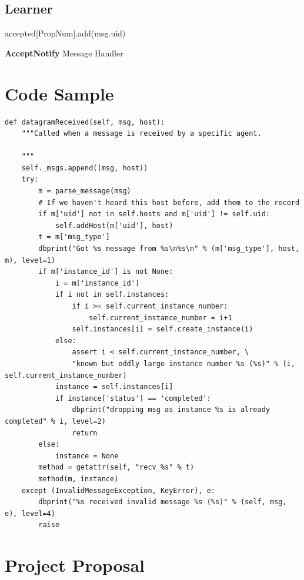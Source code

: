 \documentclass[12pt,twoside,notitlepage]{report}
\newcommand{\msg}[1] {{\bf #1}}         %
\begin{document}
\section{Learner}

\begin{algorithm}[H]
 accepted[PropNum].add(msg.uid) \\
 \caption{\msg{AcceptNotify} Message Handler}
\end{algorithm}

\chapter{Code Sample}

\begin{lstlisting}
def datagramReceived(self, msg, host):
    """Called when a message is received by a specific agent.

    """
    self._msgs.append((msg, host))
    try:
        m = parse_message(msg)
        # If we haven't heard this host before, add them to the record
        if m['uid'] not in self.hosts and m['uid'] != self.uid:
            self.addHost(m['uid'], host)
        t = m['msg_type']
        dbprint("Got %s message from %s\n%s\n" % (m['msg_type'], host, m), level=1)
        if m['instance_id'] is not None:
            i = m['instance_id']
            if i not in self.instances:
                if i >= self.current_instance_number:
                    self.current_instance_number = i+1
                self.instances[i] = self.create_instance(i)
            else:
                assert i < self.current_instance_number, \
                "known but oddly large instance number %s (%s)" % (i, self.current_instance_number)
            instance = self.instances[i]
            if instance['status'] == 'completed':
                dbprint("dropping msg as instance %s is already completed" % i, level=2)
                return
        else:
            instance = None
        method = getattr(self, "recv_%s" % t)
        method(m, instance)
    except (InvalidMessageException, KeyError), e:
        dbprint("%s received invalid message %s (%s)" % (self, msg, e), level=4)
        raise
\end{lstlisting}

\chapter{Project Proposal}


\end{document}
